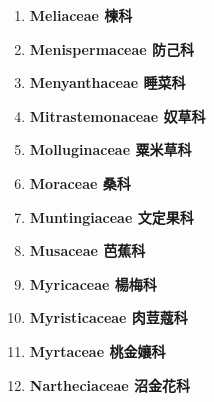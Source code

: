 \begin{enumerate}
        
      \item[] \begin{small}\textbf{Meliaceae 楝科} \end{small}
        
      \item[] \begin{small}\textbf{Menispermaceae 防己科} \end{small}
        
      \item[] \begin{small}\textbf{Menyanthaceae 睡菜科} \end{small}
        
      \item[] \begin{small}\textbf{Mitrastemonaceae 奴草科} \end{small}
        
      \item[] \begin{small}\textbf{Molluginaceae 粟米草科} \end{small}
        
      \item[] \begin{small}\textbf{Moraceae 桑科} \end{small}
        
      \item[] \begin{small}\textbf{Muntingiaceae 文定果科} \end{small}
        
      \item[] \begin{small}\textbf{Musaceae 芭蕉科} \end{small}
        
      \item[] \begin{small}\textbf{Myricaceae 楊梅科} \end{small}
        
      \item[] \begin{small}\textbf{Myristicaceae 肉荳蔻科} \end{small}
        
      \item[] \begin{small}\textbf{Myrtaceae 桃金孃科} \end{small}
        
      \item[] \begin{small}\textbf{Nartheciaceae 沼金花科} \end{small}

\end{enumerate}
